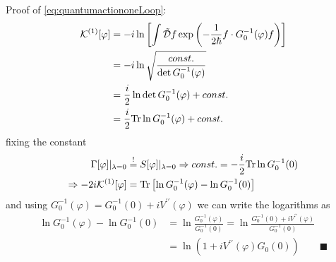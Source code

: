Proof of \ref{eq:quantumactiononeLoop}:
\begin{align*}
	\mathcal{K}^{(1)}[\varphi]&=-i \ln\left[\int \tilde{\mathcal{D}}f \exp \left(-\frac{1}{2\hbar} f\cdot G^{-1}_0(\varphi) f\right)\right]\\
	&=-i\ln\sqrt{\frac{const.}{\det G^{-1}_0(\varphi)}}\\
	&=\frac{i}{2} \ln \det G^{-1}_0(\varphi) +const.\\
	&= \frac{i}{2} \mathrm{Tr} \ln G^{-1}_0 (\varphi) + const.
\end{align*}
fixing the constant
\begin{align*}
	\Gamma[\varphi] |_{\lambda=0} &\stackrel{!}{=} S[\varphi]|_{\lambda=0} \Rightarrow const. = -\frac{i}{2} \mathrm{Tr} \ln G^{-1}_0(0) \\
	\Rightarrow -2 i\mathcal{K}^{(1)}[\varphi] &= \mathrm{Tr} \left[\ln G^{-1}_0(\varphi)-\ln G^{-1}_0(0)\right]
\end{align*}
and using $G^{-1}_0(\varphi)=G^{-1}_0(0)+iV^{\prime \prime}(\varphi)$ we can write the logarithms as
\begin{align}
	\ln G^{-1}_0(\varphi) - \ln G^{-1}_0(0) &= \ln \frac{G^{-1}_0(\varphi)}{G^{-1}_0(0)} = \ln \frac{G^{-1}_0(0)+iV^{\prime \prime}(\varphi)}{G^{-1}_0(0)}\\
&= \ln(1+iV^{\prime \prime}(\varphi)G_0(0))\qquad \blacksquare
\end{align}




